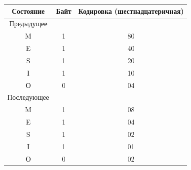       \begin{table}[b]\small %


      \vspace*{-12pt}


      \begin{center}




      \vspace*{2ex}


      


      \begin{tabular}{|c|c|c|}


      \hline


Состояние&Байт&Кодировка (шестнадцатеричная)\\


\hline


Предыдущее &&\\


\hline


M&1&80\\


E&1&40\\


S&1&20\\


I&1&10\\


О&0&04\\


\hline


Последующее&&\\


\hline


M&1&08\\


E&1&04\\


S&1&02\\


I&1&01\\


О&0&02\\


\hline


\end{tabular}


\end{center}


\end{table}





